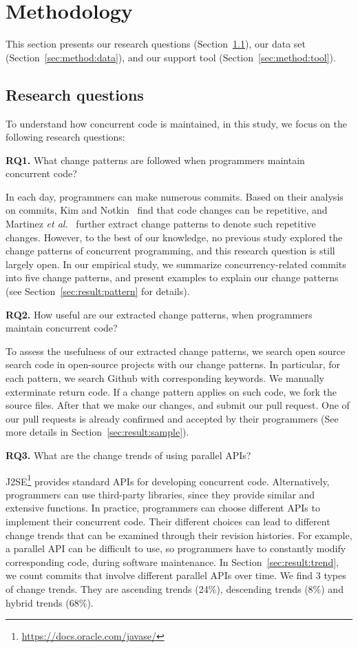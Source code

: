 \section{Methodology}
\label{sec:method}
This section presents our research questions (Section~\ref{sec:method:rq}), our data set (Section~\ref{sec:method:data}), and our support tool (Section~\ref{sec:method:tool}).
\subsection{Research questions}
\label{sec:method:rq}
To understand how concurrent code is maintained, in this study, we focus on the following research questions:

\textbf{RQ1.} What change patterns are followed when programmers maintain concurrent code?

In each day, programmers can make numerous commits. Based on their analysis on commits, Kim and Notkin~\cite{conf/icse/KimN09} find that code changes can be repetitive, and Martinez \emph{et al.}~\cite{conf/icsm/MartinezDM13} further extract change patterns to denote such repetitive changes. However, to the best of our knowledge, no previous study explored the change patterns of concurrent programming, and this research question is still largely open. In our empirical study, we summarize concurrency-related commits into five change patterns, and present examples to explain our change patterns (see Section~\ref{sec:result:pattern} for details).

\textbf{RQ2.} How useful are our extracted change patterns, when programmers maintain concurrent code?

To assess the usefulness of our extracted change patterns, we search open source search code in open-source projects with our change patterns. In particular, for each pattern, we search Github with corresponding keywords. We manually exterminate return code. If a change pattern applies on such code, we fork the source files. After that we make our changes, and submit our pull request. One of our pull requests is already confirmed and accepted by their programmers (See more details in Section~\ref{sec:result:sample}).

\textbf{RQ3.} What are the change trends of using parallel APIs?

J2SE\footnote{\url{https://docs.oracle.com/javase/}} provides standard APIs for developing concurrent code. Alternatively, programmers can use third-party libraries, since they provide similar and extensive functions. In practice, programmers can choose different APIs to implement their concurrent code. Their different choices can lead to different change trends that can be examined through their revision histories. For example, a parallel API can be difficult to use, so programmers have to constantly modify corresponding code, during software maintenance. In Section~\ref{sec:result:trend}, we count commits that involve different parallel APIs over time. We find 3 types of change trends. They are ascending trends (24\%), descending trends (8\%) and hybrid trends (68\%).%

